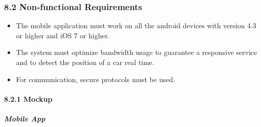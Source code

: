 \documentclass[]{article}
\providecommand{\tightlist}{%
  \setlength{\itemsep}{0pt}\setlength{\parskip}{0pt}}
\let\oldparagraph\paragraph
\renewcommand{\paragraph}[1]{\oldparagraph{#1}\mbox{}}
\let\oldsubparagraph\subparagraph
\renewcommand{\subparagraph}[1]{\oldsubparagraph{#1}\mbox{}}
\begin{document}
\subsubsection{8.2 Non-functional
Requirements}\label{non-functional-requirements}

\begin{itemize}
\tightlist
\item
  The mobile application must work on all the android devices with
  version 4.3 or higher and iOS 7 or higher.
\item
  The system must optimize bandwidth usage to guarantee a responsive
  service and to detect the position of a car real time.
\item
  For communication, secure protocols must be used. \newpage
\end{itemize}

\paragraph{8.2.1 Mockup}\label{mockup}

\subparagraph{Mobile App}\label{mobile-app}
\end{document}
